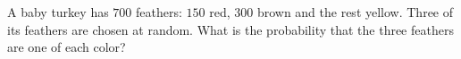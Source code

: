 A baby turkey has $700$ feathers: $150$ red, $300$ brown and the rest yellow. Three of its feathers are chosen at random. What is the probability that the three feathers are one of each color?
